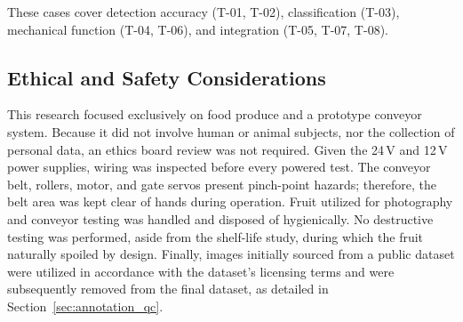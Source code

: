 These cases cover detection accuracy (T-01, T-02), classification (T-03), mechanical function (T-04, T-06), and integration (T-05, T-07, T-08).

\subsection{Ethical and Safety Considerations}
\label{sec:m_ethics}

This research focused exclusively on food produce and a prototype conveyor system. Because it did not involve human or animal subjects, nor the collection of personal data, an ethics board review was not required. Given the 24\,V and 12\,V power supplies, wiring was inspected before every powered test. The conveyor belt, rollers, motor, and gate servos present pinch-point hazards; therefore, the belt area was kept clear of hands during operation. Fruit utilized for photography and conveyor testing was handled and disposed of hygienically. No destructive testing was performed, aside from the shelf-life study, during which the fruit naturally spoiled by design. Finally, images initially sourced from a public dataset were utilized in accordance with the dataset's licensing terms and were subsequently removed from the final dataset, as detailed in Section~\ref{sec:annotation_qc}.

\clearpage
